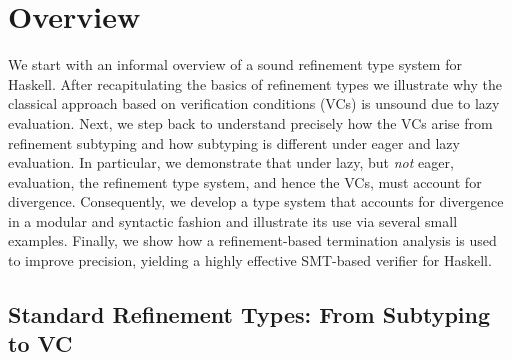 \section{Overview}\label{sec:refinedhaskell:overview}

We start with an informal overview of a sound refinement type 
system for Haskell. 
%
After recapitulating the basics of refinement types
we illustrate why the classical approach based on 
verification conditions (VCs) is unsound due to 
lazy evaluation.  
%
Next, we step back to understand precisely how the 
VCs arise from refinement subtyping and how subtyping
is different under eager and lazy evaluation. 
In particular, we demonstrate that under lazy, but 
\emph{not} eager, evaluation, the refinement type 
system, and hence the VCs, must account for divergence.
%
Consequently, we develop a type system that accounts 
for divergence in a modular and syntactic fashion 
and illustrate its use via several small examples.
%
Finally, we show how a refinement-based termination
analysis is used to improve precision, yielding 
a highly effective SMT-based verifier for Haskell.

\subsection{Standard Refinement Types: From Subtyping to VC}\label{subsec:vc}


